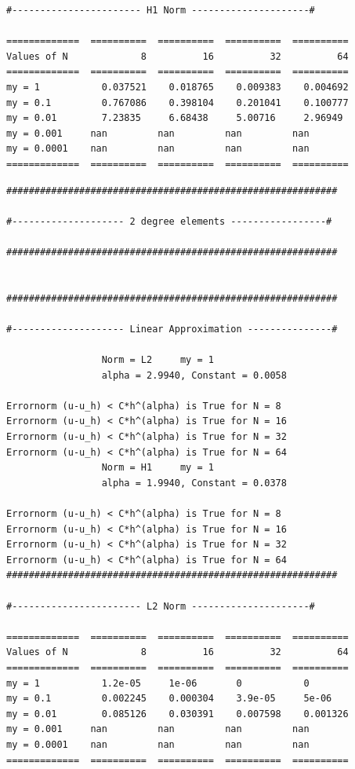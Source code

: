 \documentclass[a4paper,norsk]{article}
\begin{document}
\begin{lstlisting}[style=terminal]
#----------------------- H1 Norm ---------------------#

=============  ==========  ==========  ==========  ==========
Values of N             8          16          32          64
=============  ==========  ==========  ==========  ==========
my = 1           0.037521    0.018765    0.009383    0.004692
my = 0.1         0.767086    0.398104    0.201041    0.100777
my = 0.01        7.23835     6.68438     5.00716     2.96949
my = 0.001     nan         nan         nan         nan
my = 0.0001    nan         nan         nan         nan
=============  ==========  ==========  ==========  ==========
\end{lstlisting}
\newpage
\begin{lstlisting}[style=terminal]
###########################################################

#-------------------- 2 degree elements -----------------#

###########################################################


###########################################################

#-------------------- Linear Approximation ---------------#

                 Norm = L2     my = 1
                 alpha = 2.9940, Constant = 0.0058

Errornorm (u-u_h) < C*h^(alpha) is True for N = 8
Errornorm (u-u_h) < C*h^(alpha) is True for N = 16
Errornorm (u-u_h) < C*h^(alpha) is True for N = 32
Errornorm (u-u_h) < C*h^(alpha) is True for N = 64
                 Norm = H1     my = 1
                 alpha = 1.9940, Constant = 0.0378

Errornorm (u-u_h) < C*h^(alpha) is True for N = 8
Errornorm (u-u_h) < C*h^(alpha) is True for N = 16
Errornorm (u-u_h) < C*h^(alpha) is True for N = 32
Errornorm (u-u_h) < C*h^(alpha) is True for N = 64
###########################################################

#----------------------- L2 Norm ---------------------#

=============  ==========  ==========  ==========  ==========
Values of N             8          16          32          64
=============  ==========  ==========  ==========  ==========
my = 1           1.2e-05     1e-06       0           0
my = 0.1         0.002245    0.000304    3.9e-05     5e-06
my = 0.01        0.085126    0.030391    0.007598    0.001326
my = 0.001     nan         nan         nan         nan
my = 0.0001    nan         nan         nan         nan
=============  ==========  ==========  ==========  ==========


\end{lstlisting}
\end{document}

